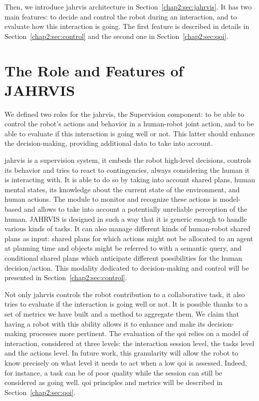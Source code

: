 \documentclass[a4paper,11pt,twoside]{StyleThese}
\begin{document}
Then, we introduce \acrshort{jahrvis} architecture in Section~\ref{chap2:sec:jahrvis}. It has two main features: to decide and control the robot during an interaction, and to evaluate how this interaction is going. The first feature is described in details in Section~\ref{chap2:sec:control} and the second one in Section~\ref{chap2:sec:qoi}.

\section{The Role and Features of JAHRVIS}\label{chap2:sec:sup_features}

We defined two roles for the \acrshort{jahrvis}, the Supervision component: to be able to control the robot's actions and behavior in a human-robot joint action, and to be able to evaluate if this interaction is going well or not. This latter should enhance the decision-making, providing additional data to take into account. 

\acrshort{jahrvis} is a supervision system, \ie it embeds the robot high-level decisions, controls its behavior and tries to react to contingencies, always considering the human it is interacting with. It is able to do so by taking into account shared plans, human mental states, its knowledge about the current state of the environment, and human actions. The module to monitor and recognize these actions is model-based and allows to take into account a potentially unreliable perception of the human. JAHRVIS is designed in such a way that it is generic enough to handle various kinds of tasks. It can also manage  different kinds of human-robot shared plans as input: shared plans for which actions might not be allocated to an agent at planning time and objects might be referred to with a semantic query, and conditional shared plans which anticipate different possibilities for the human decision/action. This modality dedicated to decision-making and control will be presented in Section~\ref{chap2:sec:control}.

Not only \acrshort{jahrvis} controls the robot contribution to a collaborative task, it also tries to evaluate if the interaction is going well or not. It is possible thanks to a set of metrics we have built and a method to aggregate them. We claim that having a robot with this ability allows it to enhance and make its decision-making processes more pertinent. The evaluation of the \acrlong{qoi} relies on a model of interaction, considered at  three levels: the interaction session level, the tasks level and the actions level. In future work, this granularity will allow the robot to know precisely on what level it needs to act when a low \acrshort{qoi} is assessed. Indeed, for instance, a task can be of poor quality while the session can still be considered as going well. \acrshort{qoi} principles and metrics will be described in Section~\ref{chap2:sec:qoi}.
\end{document}
